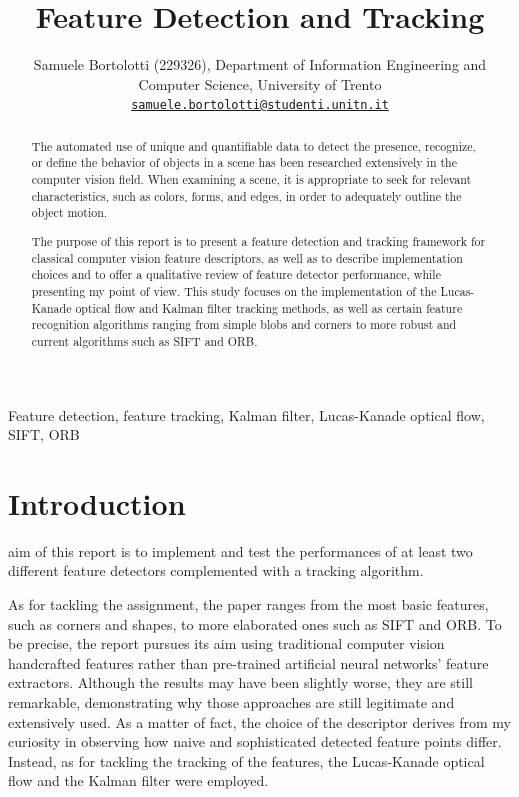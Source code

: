 \documentclass[journal]{IEEEtran}
\begin{document}
\title{Feature Detection and Tracking}
\author{Samuele Bortolotti (229326), Department of Information Engineering and Computer Science, University of Trento\\
\href{mailto:samuele.bortolotti@studenti.unitn.it}{\texttt{samuele.bortolotti@studenti.unitn.it}} }%
\maketitle
\begin{abstract}
The automated use of unique and quantifiable data to detect the presence, recognize, or define the behavior of objects in a scene has been researched extensively in the computer vision field. When examining a scene, it is appropriate to seek for relevant characteristics, such as colors, forms, and edges, in order to adequately outline the object motion. 

The purpose of this report is to present a feature detection and tracking framework for classical computer vision feature descriptors, as well as to describe implementation choices and to offer a qualitative review of feature detector performance, while presenting my point of view. This study focuses on the implementation of the Lucas-Kanade optical flow and Kalman filter tracking methods, as well as certain feature recognition algorithms ranging from simple blobs and corners to more robust and current algorithms such as SIFT and ORB.
\end{abstract}

\begin{IEEEkeywords}
Feature detection, feature tracking, Kalman filter, Lucas-Kanade optical flow, SIFT, ORB
\end{IEEEkeywords}

\IEEEpeerreviewmaketitle

\section{Introduction}

 aim of this report is to implement and test the performances of at least two different feature detectors complemented with a tracking algorithm. 

As for tackling the assignment, the paper ranges from the most basic features, such as corners and shapes, to more elaborated ones such as SIFT and ORB.
To be precise, the report pursues its aim using traditional computer vision handcrafted features rather than pre-trained artificial neural networks' feature extractors. Although the results may have been slightly worse, they are still remarkable, demonstrating why those approaches are still legitimate and extensively used. As a matter of fact, the choice of the descriptor derives from my curiosity in observing how naive and sophisticated detected feature points differ. Instead, as for tackling the tracking of the features, the Lucas-Kanade optical flow and the Kalman filter were employed.
\end{document}
